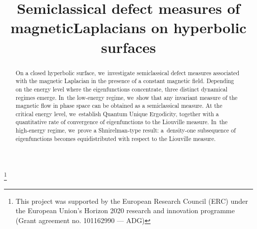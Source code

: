 \documentclass[JEP,XML,SOM,Unicode,published]{cedram}
\theoremstyle{plain}
\theoremstyle{definition}
\begin{document}
\frontmatter
\title[Semiclassical measures of magnetic Laplacians]{Semiclassical defect measures of magnetic\nobreakspace Laplacians on hyperbolic surfaces}

\author[\initial{L.} \lastname{Charles}]{ }
\address{Université de Paris and Sorbonne Université, CNRS, IMJ-PRG,\\ F-75006 Paris, France}

\author[\initial{T.} \lastname{Lefeuvre}]{ }
\address{Université Paris-Saclay, Laboratoire de mathématiques d’Orsay\\ 91405 Orsay, France}

\thanks{This project was supported by the European Research Council (ERC) under the European Union’s Horizon 2020 research and innovation programme (Grant agreement no. 101162990 — ADG)}

\begin{abstract}
On a closed hyperbolic surface, we~investigate semiclassical defect measures associated with the magnetic Laplacian in the presence of a constant magnetic field. Depending on the energy level where the eigenfunctions concentrate, three distinct dynamical regimes emerge. In~the low-energy regime, we~show that any invariant measure of the magnetic flow in phase space can be obtained as a semiclassical measure. At the critical energy level, we~establish Quantum Unique Ergodicity, together with a quantitative rate of convergence of eigenfunctions to the Liouville measure. In~the high-energy regime, we~prove a Shnirelman-type result: a~density-one subsequence of eigenfunctions becomes equidistributed with respect to the Liouville measure.
\end{abstract}




\end{document}
